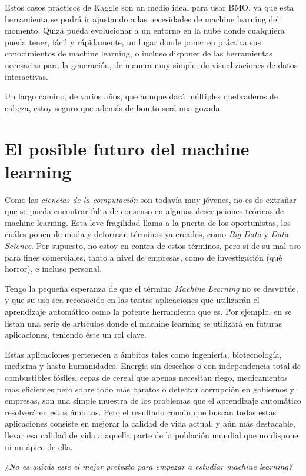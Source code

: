Estos casos prácticos de Kaggle son un medio ideal para usar BMO, ya que esta herramienta se podrá ir ajustando a las necesidades de machine learning del momento. Quizá pueda evolucionar a un entorno en la nube donde cualquiera pueda tener, fácil y rápidamente, un lugar donde poner en práctica sus conocimientos de machine learning, o incluso disponer de las herramientas necesarias para la generación, de manera muy simple, de visualizaciones de datos interactivas.

Un largo camino, de varios años, que aunque dará múltiples quebraderos de cabeza, estoy seguro que además de bonito será una gozada.

\section{El posible futuro del machine learning} \label{sec:6.3}

Como las \emph{ciencias de la computación} son todavía muy jóvenes, no es de extrañar que se pueda encontrar falta de consenso en algunas descripciones teóricas de machine learning. Esta leve fragilidad llama a la puerta de los oportunistas, los cuáles ponen de moda y deforman términos ya creados, como \emph{Big Data} y \emph{Data Science}. Por supuesto, no estoy en contra de estos términos, pero si de su mal uso para fines comerciales, tanto a nivel de empresas, como de investigación (qué horror), e incluso personal.

Tengo la pequeña esperanza de que el término \emph{Machine Learning} no se desvirtúe, y que su uso sea reconocido en las tantas aplicaciones que utilizarán el aprendizaje automático como la potente herramienta que es. Por ejemplo, en \cite{kantardzic2005next} se listan una serie de artículos donde el machine learning se utilizará en futuras aplicaciones, teniendo éste un rol clave.

Estas aplicaciones pertenecen a ámbitos tales como ingeniería, biotecnología, medicina y hasta humanidades. Energía sin desechos o con independencia total de combustibles fósiles, cepas de cereal que apenas necesitan riego, medicamentos más eficientes pero sobre todo más baratos o detectar corrupción en gobiernos y empresas, son una simple muestra de los problemas que el aprendizaje automático resolverá en estos ámbitos. Pero el resultado común que buscan todas estas aplicaciones consiste en mejorar la calidad de vida actual, y aún más destacable, llevar esa calidad de vida a aquella parte de la población mundial que no dispone ni un ápice de ella.

\emph{¿No es quizás este el mejor pretexto para empezar a estudiar machine learning?}
